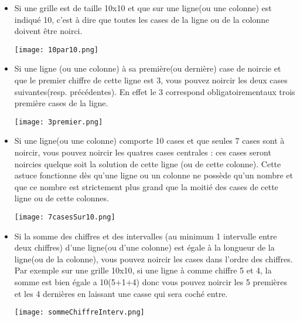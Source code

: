 	\begin{itemize}
		\item Si une grille est de taille 10x10 et que sur une ligne(ou une colonne) est indiqué 10, c'est à dire que toutes les cases de la ligne ou de la colonne doivent être noirci.\\

	\begin{center}
		\texttt{[image: 10par10.png]}\\
	\end{center}

		\item Si une ligne (ou une colonne) à sa première(ou dernière) case de noircie et que le premier chiffre de cette ligne est 3, vous pouvez noircir les deux cases suivantes(resp. précédentes). En effet le 3 correspond obligatoirementaux trois première cases de la ligne.\\
	\begin{center}
		\texttt{[image: 3premier.png]}\\
	\end{center}
\newpage
		\item Si une ligne(ou une colonne) comporte 10 cases et que seules 7 cases sont à noircir, vous pouvez noircir les quatres cases centrales : ces cases seront noircies quelque soit la solution de cette ligne (ou de cette colonne). Cette astuce fonctionne dès qu'une ligne ou un colonne ne possède qu'un nombre et que ce nombre est strictement plus grand que la moitié des cases de cette ligne ou de cette colonnes.\\

	\begin{center}
		\texttt{[image: 7casesSur10.png]}
	\end{center}
		
		\item Si la somme des chiffres et des intervalles (au minimum 1 intervalle entre deux chiffres) d'une ligne(ou d'une colonne) est égale à la longueur de la ligne(ou de la colonne), vous pouvez noircir les cases dans l'ordre des chiffres. Par exemple sur une grille 10x10, si une ligne à comme chiffre 5 et 4, la somme est bien égale a 10(5+1+4) donc vous pouvez noircir les 5 premières et les 4 dernières en laissant une casse qui sera coché entre.\\
		
	\begin{center}
		\texttt{[image: sommeChiffreInterv.png]}
	\end{center}
	
	
	\end{itemize}

